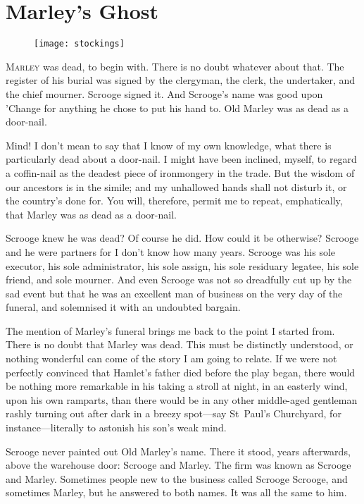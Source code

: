 \chapter{Marley's Ghost}
	
\begin{figure}[h]
\centering
\texttt{[image: stockings]}
\caption[Headpiece to Stave I]{}
\end{figure}
\lettrine[lines=4]{M}{arley} was dead, to begin with. There is no doubt what\-ev\-er about that. The register of his burial was signed by the clergyman, the clerk, the undertaker, and the chief mourner. Scrooge signed it. And Scrooge's name was good upon 'Change for anything he chose to put his hand to. Old Marley was as dead as a door-nail.

Mind! I don't mean to say that I know of my own knowledge, what there is particularly dead about a door-nail. I might have been inclined, myself, to regard a coffin-nail as the deadest piece of ironmongery in the trade. But the wisdom of our ancestors is in the simile; and my unhallowed hands shall not disturb it, or the country's done for. You will, therefore, permit me to repeat, emphatically, that Marley was as dead as a door-nail.

Scrooge knew he was dead? Of course he did. How could it be otherwise? Scrooge and he were partners for I don't know how many years. Scrooge was his sole executor, his sole administrator, his sole assign, his sole residuary legatee, his sole friend, and sole mourner. And even Scrooge was not so dreadfully cut up by the sad event but that he was an excellent man of business on the very day of the funeral, and solemnised it with an undoubted bargain.

The mention of Marley's funeral brings me back to the point I started from. There is no doubt that Marley was dead. This must be distinctly understood, or nothing wonderful can come of the story I am going to relate. If we were not perfectly convinced that Hamlet's father died before the play began, there would be nothing more remarkable in his taking a stroll at night, in an easterly wind, upon his own ramparts, than there would be in any other middle-aged gentleman rashly turning out after dark in a breezy spot—say St~Paul's Churchyard, for instance—literally to astonish his son's weak mind.

Scrooge never painted out Old Marley's name. There it stood, years afterwards, above the warehouse door: Scrooge and Marley. The firm was known as Scrooge and Marley. Sometimes people new to the business called Scrooge Scrooge, and sometimes Marley, but he answered to both names. It was all the same to him.

